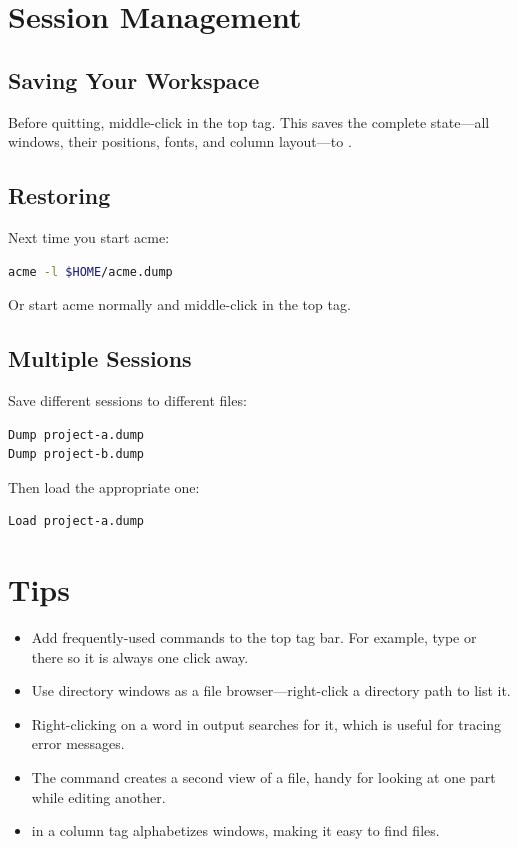 \section{Session Management}
\label{sec:sessions}


\subsection{Saving Your Workspace}

Before quitting, middle-click  in the top tag.  This saves
the complete state---all windows, their positions, fonts, and column
layout---to .

\subsection{Restoring}

Next time you start acme:

\begin{lstlisting}[language=bash]
acme -l $HOME/acme.dump
\end{lstlisting}

Or start acme normally and middle-click  in the top tag.

\subsection{Multiple Sessions}

Save different sessions to different files:

\begin{Verbatim}[frame=single]
Dump project-a.dump
Dump project-b.dump
\end{Verbatim}

\noindent
Then load the appropriate one:

\begin{Verbatim}[frame=single]
Load project-a.dump
\end{Verbatim}

\section{Tips}

\begin{itemize}
\item Add frequently-used commands to the top tag bar.  For example,
      type  or  there so it is always one
      click away.
\item Use directory windows as a file browser---right-click a directory
      path to list it.
\item Right-clicking on a word in  output searches for
      it, which is useful for tracing error messages.
\item The  command creates a second view of a file, handy for
      looking at one part while editing another.
\item {} in a column tag alphabetizes windows, making it easy
      to find files.
\end{itemize}
